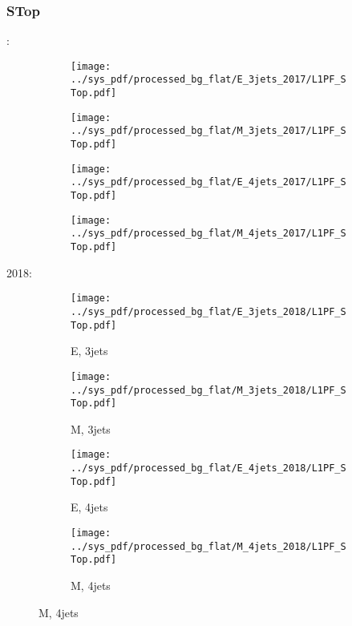 \documentclass{beamer}
\begin{document}
\begin{frame}
\frametitle{STop}
\fontsize{5}{1}:
\begin{figure}
\centering
\begin{subfigure}[b]{0.24\textwidth}
\texttt{[image: ../sys\_pdf/processed\_bg\_flat/E\_3jets\_2017/L1PF\_STop.pdf]}
\end{subfigure}
\begin{subfigure}[b]{0.24\textwidth}
\texttt{[image: ../sys\_pdf/processed\_bg\_flat/M\_3jets\_2017/L1PF\_STop.pdf]}
\end{subfigure}
\begin{subfigure}[b]{0.24\textwidth}
\texttt{[image: ../sys\_pdf/processed\_bg\_flat/E\_4jets\_2017/L1PF\_STop.pdf]}
\end{subfigure}
\begin{subfigure}[b]{0.24\textwidth}
\texttt{[image: ../sys\_pdf/processed\_bg\_flat/M\_4jets\_2017/L1PF\_STop.pdf]}
\end{subfigure}
\end{figure}
2018:
\begin{figure}
\centering
\begin{subfigure}[b]{0.24\textwidth}
\texttt{[image: ../sys\_pdf/processed\_bg\_flat/E\_3jets\_2018/L1PF\_STop.pdf]}
\captionsetup{font=tiny}
\caption{E, 3jets}
\end{subfigure}
\begin{subfigure}[b]{0.24\textwidth}
\texttt{[image: ../sys\_pdf/processed\_bg\_flat/M\_3jets\_2018/L1PF\_STop.pdf]}
\captionsetup{font=tiny}
\caption{M, 3jets}
\end{subfigure}
\begin{subfigure}[b]{0.24\textwidth}
\texttt{[image: ../sys\_pdf/processed\_bg\_flat/E\_4jets\_2018/L1PF\_STop.pdf]}
\captionsetup{font=tiny}
\caption{E, 4jets}
\end{subfigure}
\begin{subfigure}[b]{0.24\textwidth}
\texttt{[image: ../sys\_pdf/processed\_bg\_flat/M\_4jets\_2018/L1PF\_STop.pdf]}
\captionsetup{font=tiny}
\caption{M, 4jets}
\end{subfigure}
\end{figure}
\end{frame}
\end{document}
